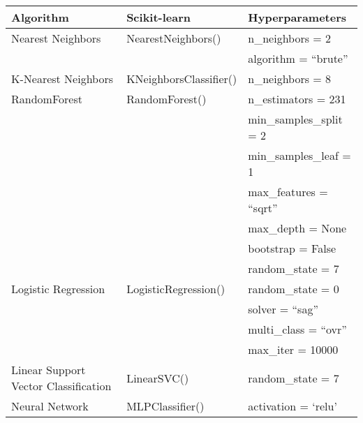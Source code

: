 \begin{table}[H]
  \centering
    \begin{tabular}{lll}
        \toprule
        \textbf{Algorithm}                  & \textbf{Scikit-learn}     & \textbf{Hyperparameters}  \\
        \midrule
        Nearest Neighbors                   & NearestNeighbors()        & n\_neighbors = 2          \\
                                            &                           & algorithm = “brute”       \\
        \midrule
        K-Nearest Neighbors                 & KNeighborsClassifier()    & n\_neighbors = 8          \\
        \midrule
        RandomForest                        & RandomForest()            & n\_estimators = 231       \\
                                            &                           & min\_samples\_split = 2   \\
                                            &                           & min\_samples\_leaf = 1    \\
                                            &                           & max\_features = “sqrt”    \\
                                            &                           & max\_depth = None         \\
                                            &                           & bootstrap = False         \\
                                            &                           & random\_state = 7         \\
        \midrule
        Logistic Regression                 & LogisticRegression()      & random\_state = 0         \\
                                            &                           & solver = “sag”            \\
                                            &                           & multi\_class = “ovr”      \\
                                            &                           & max\_iter = 10000         \\
        \midrule
        Linear Support Vector Classification& LinearSVC()               & random\_state = 7         \\
        \midrule
        Neural Network                      & MLPClassifier()           & activation = ‘relu’       \\

\end{tabular}
\end{table}
